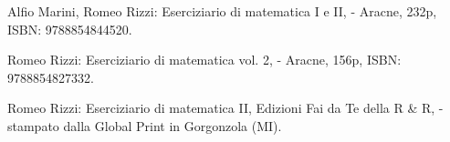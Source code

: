 
\begin{etaremune}
\vspace{-3.0mm}
  \item {\sc Alfio Marini, Romeo Rizzi:}
   \newblock  Eserciziario di matematica I e II,
    - Aracne, 232p, ISBN: 9788854844520.
\vspace{-3.0mm}
  \item {\sc Romeo Rizzi:}
   \newblock  Eserciziario di matematica vol. 2,
    - Aracne, 156p, ISBN: 9788854827332.
\vspace{-3.0mm}
  \item {\sc Romeo Rizzi:}
   \newblock  Eserciziario di matematica II,
   \newblock Edizioni Fai da Te della R \& R,
    - stampato dalla Global Print in Gorgonzola (MI).
\end{etaremune}

